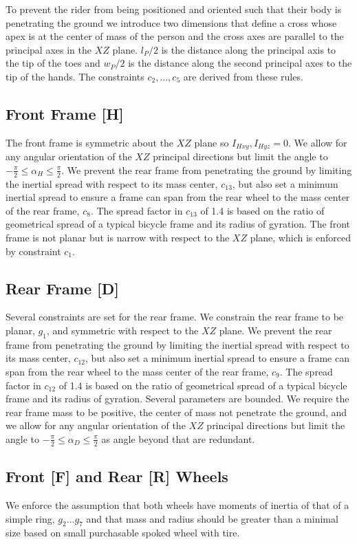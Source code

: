 \documentclass{bmd2019p}
\begin{document}
To prevent the rider from being positioned and oriented such that their body is
penetrating the ground we introduce two dimensions that define a cross whose
apex is at the center of mass of the person and the cross axes are parallel to
the principal axes in the $XZ$ plane. $l_P / 2$ is the distance along the
principal axis to the tip of the toes and $w_P / 2$ is the distance along the
second principal axes to the tip of the hands. The constraints $c_2,\ldots,c_5$
are derived from these rules.

\subsection{Front Frame [H]}
%
The front frame is symmetric about the $XZ$ plane so $I_{Hxy}, I_{Hyz} = 0$. We
allow for any angular orientation of the $XZ$ principal directions but limit
the angle to $-\frac{\pi}{2} \leq \alpha_H \leq \frac{\pi}{2}$. We prevent the
rear frame from penetrating the ground by limiting the inertial spread with
respect to its mass center, $c_{13}$, but also set a minimum inertial spread to
ensure a frame can span from the rear wheel to the mass center of the rear
frame, $c_8$. The spread factor in $c_{13}$ of 1.4 is based on the ratio of
geometrical spread of a typical bicycle frame and its radius of gyration. The
front frame is not planar but is narrow with respect to the $XZ$ plane, which
is enforced by constraint $c_1$.

\subsection{Rear Frame [D]}
%
Several constraints are set for the rear frame. We constrain the rear frame to
be planar, $g_1$, and symmetric with respect to the $XZ$ plane. We prevent the
rear frame from penetrating the ground by limiting the inertial spread with
respect to its mass center, $c_{12}$, but also set a minimum inertial spread to
ensure a frame can span from the rear wheel to the mass center of the rear
frame, $c_9$. The spread factor in $c_{12}$ of 1.4 is based on the ratio of
geometrical spread of a typical bicycle frame and its radius of gyration.
Several parameters are bounded. We require the rear frame mass to be positive,
the center of mass not penetrate the ground, and we allow for any angular
orientation of the $XZ$ principal directions but limit the angle to
$-\frac{\pi}{2} \leq \alpha_D \leq \frac{\pi}{2}$ as angle beyond that are
redundant.

\subsection{Front [F] and Rear [R] Wheels}
%
We enforce the assumption that both wheels have moments of inertia of that of a
simple ring, $g_2 \ldots g_7$ and that mass and radius should be greater than a
minimal size based on small purchasable spoked wheel with tire.
\end{document}
